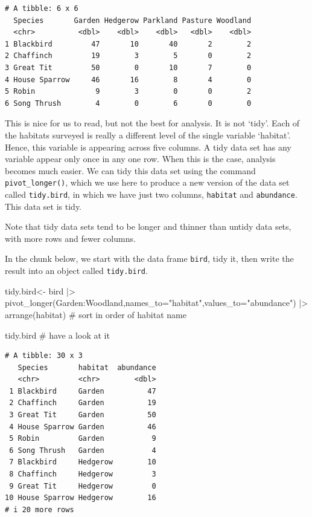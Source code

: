 \documentclass[
  letterpaper,
  DIV=11,
  numbers=noendperiod]{scrreprt}
\newenvironment{Shaded}{\begin{snugshade}}{\end{snugshade}}
\newcommand{\AttributeTok}[1]{\textcolor[rgb]{0.40,0.45,0.13}{#1}}
\newcommand{\CommentTok}[1]{\textcolor[rgb]{0.37,0.37,0.37}{#1}}
\newcommand{\FunctionTok}[1]{\textcolor[rgb]{0.28,0.35,0.67}{#1}}
\newcommand{\NormalTok}[1]{\textcolor[rgb]{0.00,0.23,0.31}{#1}}
\newcommand{\OtherTok}[1]{\textcolor[rgb]{0.00,0.23,0.31}{#1}}
\newcommand{\SpecialCharTok}[1]{\textcolor[rgb]{0.37,0.37,0.37}{#1}}
\newcommand{\StringTok}[1]{\textcolor[rgb]{0.13,0.47,0.30}{#1}}
\begin{document}
\begin{verbatim}
# A tibble: 6 x 6
  Species       Garden Hedgerow Parkland Pasture Woodland
  <chr>          <dbl>    <dbl>    <dbl>   <dbl>    <dbl>
1 Blackbird         47       10       40       2        2
2 Chaffinch         19        3        5       0        2
3 Great Tit         50        0       10       7        0
4 House Sparrow     46       16        8       4        0
5 Robin              9        3        0       0        2
6 Song Thrush        4        0        6       0        0
\end{verbatim}

This is nice for us to read, but not the best for analysis. It is not
`tidy'. Each of the habitats surveyed is really a different level of the
single variable `habitat'. Hence, this variable is appearing across five
columns. A tidy data set has any variable appear only once in any one
row. When this is the case, analysis becomes much easier. We can tidy
this data set using the command \texttt{pivot\_longer()}, which we use
here to produce a new version of the data set called \texttt{tidy.bird},
in which we have just two columns, \texttt{habitat} and
\texttt{abundance}. This data set is tidy.

Note that tidy data sets tend to be longer and thinner than untidy data
sets, with more rows and fewer columns.

In the chunk below, we start with the data frame \texttt{bird}, tidy it,
then write the result into an object called \texttt{tidy.bird}.

\begin{Shaded}
\begin{Highlighting}[]
\NormalTok{tidy.bird}\OtherTok{\textless{}{-}}\NormalTok{ bird }\SpecialCharTok{|\textgreater{}}
  \FunctionTok{pivot\_longer}\NormalTok{(Garden}\SpecialCharTok{:}\NormalTok{Woodland,}\AttributeTok{names\_to=}\StringTok{"habitat"}\NormalTok{,}\AttributeTok{values\_to=}\StringTok{"abundance"}\NormalTok{) }\SpecialCharTok{|\textgreater{}}
  \FunctionTok{arrange}\NormalTok{(habitat) }\CommentTok{\# sort in order of habitat name}

\NormalTok{tidy.bird }\CommentTok{\# have a look at it}
\end{Highlighting}
\end{Shaded}

\begin{verbatim}
# A tibble: 30 x 3
   Species       habitat  abundance
   <chr>         <chr>        <dbl>
 1 Blackbird     Garden          47
 2 Chaffinch     Garden          19
 3 Great Tit     Garden          50
 4 House Sparrow Garden          46
 5 Robin         Garden           9
 6 Song Thrush   Garden           4
 7 Blackbird     Hedgerow        10
 8 Chaffinch     Hedgerow         3
 9 Great Tit     Hedgerow         0
10 House Sparrow Hedgerow        16
# i 20 more rows
\end{verbatim}
\end{document}

